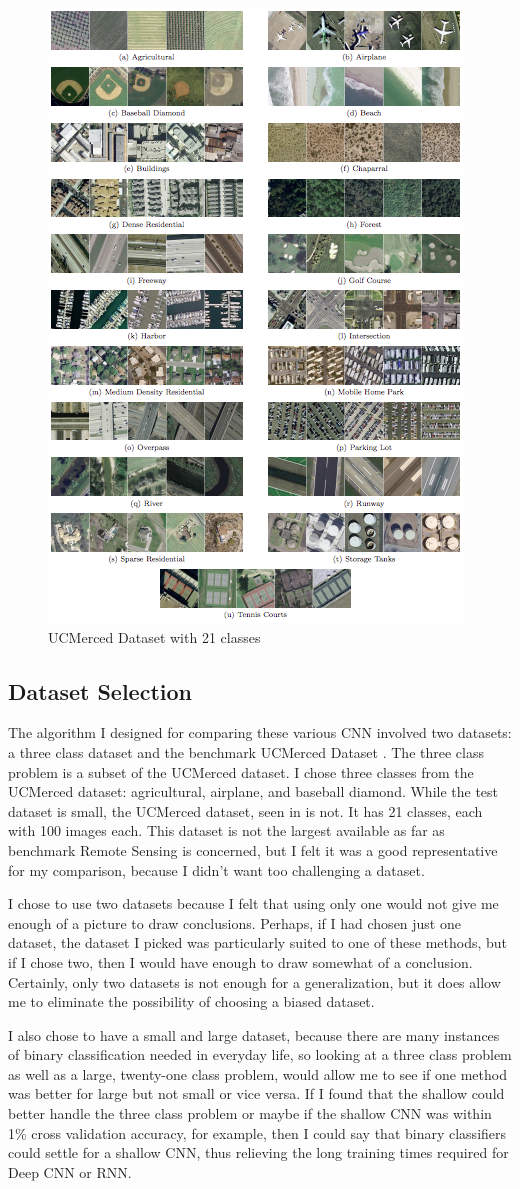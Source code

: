 \documentclass[12pt]{article}
\begin{document}
	\begin{figure}[t!]
		\centering
		\includegraphics[width=0.5\linewidth]{img/ucm.png}
		\caption{UCMerced Dataset with 21 classes}
		\label{fig:ucm}
	\end{figure}
	
	\subsection{Dataset Selection}
The algorithm I designed for comparing these various CNN involved two datasets: a three class dataset and the benchmark UCMerced Dataset \cite{ucm}. The three class problem is a subset of the UCMerced dataset. I chose three classes from the UCMerced dataset: agricultural, airplane, and baseball diamond. While the test dataset is small, the UCMerced dataset, seen in  is not. It has 21 classes, each with 100 images each. This dataset is not the largest available as far as benchmark Remote Sensing is concerned, but I felt it was a good representative for my comparison, because I didn't want too challenging a dataset. 

I chose to use two datasets because I felt that using only one would not give me enough of a picture to draw conclusions. Perhaps, if I had chosen just one dataset, the dataset I picked was particularly suited to one of these methods, but if I chose two, then I would have enough to draw somewhat of a conclusion. Certainly, only two datasets is not enough for a generalization, but it does allow me to eliminate the possibility of choosing a biased dataset.

I also chose to have a small and large dataset, because there are many instances of binary classification needed in everyday life, so looking at a three class problem as well as a large, twenty-one class problem, would allow me to see if one method was better for large but not small or vice versa. If I found that the shallow could better handle the three class problem or maybe if the shallow CNN was within 1\% cross validation accuracy, for example, then I could say that binary classifiers could settle for a shallow CNN, thus relieving the long training times required for Deep CNN or RNN. 
\end{document}
